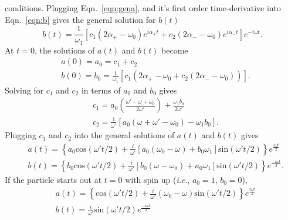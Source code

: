 conditions.  Plugging Eqn.~\ref{eqn:gena}, and it's first order
time-derivative into Eqn.~\ref{eqn:b} gives the general solution for
$b(t)$
%
\begin{equation}
b(t) = \frac{1}{\omega_{1}}[c_{1}(2\alpha_{+}-\omega_{0})e^{i\alpha_{+}t} + c_{2}(2\alpha_{-}-\omega_{0})e^{i\alpha_{-}t}]e^{-i\omega t}.
\end{equation}
%
At $t=0$, the solutions of $a(t)$ and $b(t)$ become
%
\begin{equation}
\begin{split}
& a(0)= a_{0} = c_{1} + c_{2} \\
& b(0) = b_{0} = \frac{1}{\omega_{1}}[c_{1}(2\alpha_{+}-\omega_{0}+ c_{2}(2\alpha_{-}-\omega_{0}))].
\end{split}
\end{equation}
%
Solving for $c_{1}$ and $c_{2}$ in terms of $a_{0}$ and $b_{0}$ gives
%
\begin{equation}
\begin{split}
&c_{1} = a_{0}(\frac{\omega' - \omega + \omega_{0}}{2\omega'}) + \frac{\omega_{1}b_{0}}{2\omega'} \\
&c_{2} = \frac{1}{\omega'}[a_{0}(\omega+\omega'-\omega_{0})-\omega_{1}b_{0}].
\end{split}
\end{equation}
%
Plugging $c_{1}$ and $c_{2}$ into the general solutions of $a(t)$ and
$b(t)$ gives
%
\begin{equation}
  \label{eqn:aNb}
\begin{split}
&a(t) = \left\lbrace a_{0} \textrm{cos}(\omega' t/2) + \frac{i}{\omega'}[a_{0}(\omega_{0}-\omega) + b_{0}\omega_{1}] \textrm{sin}(\omega' t/2)
\right\rbrace e^{\frac{i\omega t}{2}} \\
&b(t) = \left\lbrace b_{0} \textrm{cos}(\omega' t/2) + \frac{i}{\omega'}[b_{0}(\omega-\omega_{0}) + a_{0}\omega_{1}]\textrm{sin}(\omega' t/2) \right\rbrace e^{\frac{-i\omega t}{2}}.
\end{split}
\end{equation}
%
If the particle starts out at $t=0$ with spin up ({\it i.e}., $a_{0} =1$,
$b_{0} = 0$),
%
\begin{equation}
\begin{split}
&a(t) =  \left\lbrace \textrm{cos}(\omega' t/2) + \frac{i}{\omega'}(\omega_{0}-\omega)\textrm{sin}(\omega' t/2)
\right\rbrace e^{\frac{i\omega t}{2}} \\
&b(t) = \frac{i}{\omega'}\textrm{sin}(\omega' t/2) e^{\frac{-i\omega t}{2}}
\end{split}
\end{equation}
